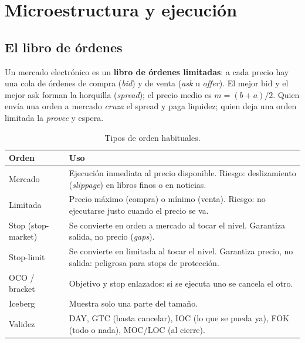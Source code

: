\chapter{Microestructura y ejecución}\label{cap:micro}

\section{El libro de órdenes}
Un mercado electrónico es un \textbf{libro de órdenes limitadas}: a cada precio hay una cola de
órdenes de compra (\emph{bid}) y de venta (\emph{ask} u \emph{offer}). El mejor bid y el mejor ask
forman la horquilla (\emph{spread}); el precio medio es $m = (b+a)/2$. Quien envía una orden a mercado
\emph{cruza} el spread y paga liquidez; quien deja una orden limitada la \emph{provee} y espera.

\begin{table}[h]\centering\small
\begin{tabularx}{\textwidth}{lX}
\toprule
Orden & Uso \\ \midrule
Mercado & Ejecución inmediata al precio disponible. Riesgo: deslizamiento (\emph{slippage}) en libros finos o en noticias. \\
Limitada & Precio máximo (compra) o mínimo (venta). Riesgo: no ejecutarse justo cuando el precio se va. \\
Stop (stop-market) & Se convierte en orden a mercado al tocar el nivel. Garantiza salida, no precio (\emph{gaps}). \\
Stop-limit & Se convierte en limitada al tocar el nivel. Garantiza precio, no salida: peligrosa para stops de protección. \\
OCO / bracket & Objetivo y stop enlazados: si se ejecuta uno se cancela el otro. \\
Iceberg & Muestra solo una parte del tamaño. \\
Validez & DAY, GTC (hasta cancelar), IOC (lo que se pueda ya), FOK (todo o nada), MOC/LOC (al cierre). \\
\bottomrule
\end{tabularx}
\caption{Tipos de orden habituales.}
\end{table}

